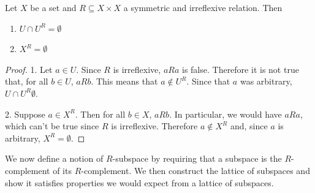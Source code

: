 \begin{mathSection}
	\begin{prop}\label{pm_ensmblespaces_symirreflproperties}
		Let $X$ be a set and $R \subseteq X \times X$ a symmetric and irreflexive relation. Then
		\begin{enumerate}
			\item $U \cap U^{R} = \emptyset$
			\item $X^{R} = \emptyset$
		\end{enumerate}
	\end{prop}
	
	\begin{proof}
		1. Let $a \in U$. Since $R$ is irreflexive,  $aRa$ is false. Therefore it is not true that, for all $b \in U$, $aRb$. This means that $a \notin U^{R}$. Since that $a$ was arbitrary, $U \cap U^{R} \emptyset$.
		
		2. Suppose $a \in X^{R}$. Then for all $b \in X$, $aRb$. In particular, we would have $aRa$, which can't be true since $R$ is irreflexive. Therefore $a \notin X^{R}$ and, since $a$ is arbitrary, $X^{R} = \emptyset$.
	\end{proof}
\end{mathSection}

We now define a notion of $R$-subspace by requiring that a subspace is the $R$-complement of its $R$-complement. We then construct the lattice of subspaces and show it satisfies properties we would expect from a lattice of subspaces.

